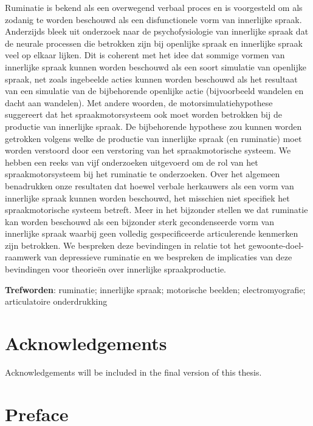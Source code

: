 \documentclass[a4paper,12pt,twoside,openright,oldfontcommands,final]{memoir}
\newcommand{\initial}[1]{
	\lettrine[lines=3,lhang=0.33,nindent=0em]{
		\color{gray}
     		{\textsc{#1}}}{}}
\newcommand\blankpage{%
    \null
    \thispagestyle{empty}%
    \newpage
    }
\newcommand{\clearemptydoublepage}{\newpage{\thispagestyle{empty}\cleardoublepage}}
\begin{document}
\initial{R}uminatie is bekend als een overwegend verbaal proces en is voorgesteld om als zodanig te worden beschouwd als een disfunctionele vorm van innerlijke spraak. Anderzijds bleek uit onderzoek naar de psychofysiologie van innerlijke spraak dat de neurale processen die betrokken zijn bij openlijke spraak en innerlijke spraak veel op elkaar lijken. Dit is coherent met het idee dat sommige vormen van innerlijke spraak kunnen worden beschouwd als een soort simulatie van openlijke spraak, net zoals ingebeelde acties kunnen worden beschouwd als het resultaat van een simulatie van de bijbehorende openlijke actie (bijvoorbeeld wandelen en dacht aan wandelen). Met andere woorden, de motorsimulatiehypothese suggereert dat het spraakmotorsysteem ook moet worden betrokken bij de productie van innerlijke spraak. De bijbehorende hypothese zou kunnen worden getrokken volgens welke de productie van innerlijke spraak (en ruminatie) moet worden verstoord door een verstoring van het spraakmotorische systeem. We hebben een reeks van vijf onderzoeken uitgevoerd om de rol van het spraakmotorsysteem bij het ruminatie te onderzoeken. Over het algemeen benadrukken onze resultaten dat hoewel verbale herkauwers als een vorm van innerlijke spraak kunnen worden beschouwd, het misschien niet specifiek het spraakmotorische systeem betreft. Meer in het bijzonder stellen we dat ruminatie kan worden beschouwd als een bijzonder sterk gecondenseerde vorm van innerlijke spraak waarbij geen volledig gespecificeerde articulerende kenmerken zijn betrokken. We bespreken deze bevindingen in relatie tot het gewoonte-doel-raamwerk van depressieve ruminatie en we bespreken de implicaties van deze bevindingen voor theorieën over innerlijke spraakproductie.

\vspace{\baselineskip}

\textbf{Trefworden}: ruminatie; innerlijke spraak; motorische beelden; electromyografie; articulatoire onderdrukking

\clearemptydoublepage

\chapter*{Acknowledgements}

\initial{A}cknowledgements will be included in the final version of this thesis.

\afterpage{\blankpage}

\chapter*{Preface}
\end{document}
